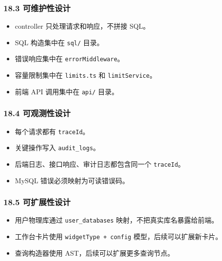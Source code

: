 \documentclass[
  a4paper,
  UTF8]{ctexart}
\providecommand{\tightlist}{%
  \setlength{\itemsep}{0pt}\setlength{\parskip}{0pt}}
\begin{document}
\hypertarget{ux53efux7ef4ux62a4ux6027ux8bbeux8ba1}{%
\subsubsection{18.3
可维护性设计}\label{ux53efux7ef4ux62a4ux6027ux8bbeux8ba1}}

\begin{itemize}
\tightlist
\item
  controller 只处理请求和响应，不拼接 SQL。
\item
  SQL 构造集中在 \texttt{sql/} 目录。
\item
  错误响应集中在 \texttt{errorMiddleware}。
\item
  容量限制集中在 \texttt{limits.ts} 和 \texttt{limitService}。
\item
  前端 API 调用集中在 \texttt{api/} 目录。
\end{itemize}

\hypertarget{ux53efux89c2ux6d4bux6027ux8bbeux8ba1}{%
\subsubsection{18.4
可观测性设计}\label{ux53efux89c2ux6d4bux6027ux8bbeux8ba1}}

\begin{itemize}
\tightlist
\item
  每个请求都有 \texttt{traceId}。
\item
  关键操作写入 \texttt{audit\_logs}。
\item
  后端日志、接口响应、审计日志都包含同一个 \texttt{traceId}。
\item
  MySQL 错误必须映射为可读错误码。
\end{itemize}

\hypertarget{ux53efux6269ux5c55ux6027ux8bbeux8ba1}{%
\subsubsection{18.5
可扩展性设计}\label{ux53efux6269ux5c55ux6027ux8bbeux8ba1}}

\begin{itemize}
\tightlist
\item
  用户物理库通过 \texttt{user\_databases} 映射，不把真实库名暴露给前端。
\item
  工作台卡片使用 \texttt{widgetType\ +\ config}
  模型，后续可以扩展新卡片。
\item
  查询构造器使用 AST，后续可以扩展更多查询节点。
\end{itemize}
\end{document}
